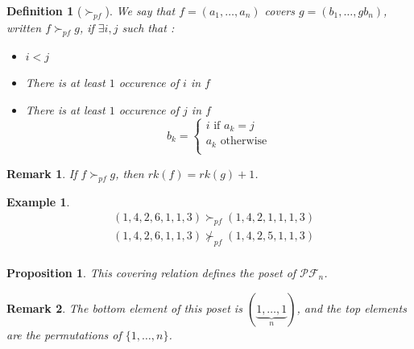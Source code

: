 \documentclass[12pt]{report}
\newtheorem*{prop}{Proposition}
\newtheorem{definition}{Definition}
\newtheorem*{example}{Example}
\newtheorem*{rem}{Remark}
\begin{document}
\begin{definition}[$\succ_{pf}$]
    We say that $f = (a_1, \ldots, a_n)$ covers 
    $g = (b_1, \ldots, gb_n)$, written $f \succ_{pf} g$,
    if $\exists i, j$ such that :
    \begin{itemize}
        \item $i < j$
        \item There is at least $1$ occurence of $i$ in $f$
        \item There is at least $1$ occurence of $j$ in $f$
        $$b_k =
            \begin{cases}
                i \text{ if } a_k = j\\
                a_k \text{ otherwise}\\
            \end{cases}$$
    \end{itemize} 
\end{definition}

\begin{rem}
    If $f \succ_{pf} g$, then $rk(f) = rk(g) + 1$.
\end{rem}

\begin{example}
    \begin{align*}
        &(1, 4, 2, 6, 1, 1, 3) \succ_{pf} (1, 4, 2, 1, 1, 1, 3)\\
        &(1, 4, 2, 6, 1, 1, 3) \not \succ_{pf} (1, 4, 2, 5, 1, 1, 3)\\
    \end{align*}
\end{example}

\begin{prop}
    This covering relation defines the \emph{poset}
    of $\mathcal{PF}_n$.
\end{prop}

\begin{rem}
    The bottom element of this poset is
    $(\underbrace{1, \ldots, 1}_{n})$,
    and the top elements are the \emph{permutations} of
    $\{1, \ldots, n\}$.
\end{rem}
\end{document}
